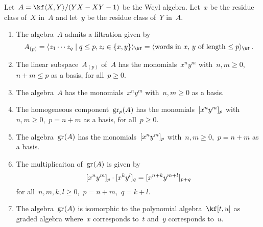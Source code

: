 \begin{proposition}
  \label{results about the weyl algerba}
  Let~$A = \kf\gen{X,Y} / \ideal{YX - XY - 1}$ be the Weyl algebra.
  Let~$x$ be the residue class of~$X$ in~$A$ and let~$y$ be the residue class of~$Y$ in~$A$.
  \begin{enumerate}
    \item
      The algebra~$A$ admits a filtration given by
      \[
        A_{(p)}
        =
        \gen{
          z_1 \dotsm z_q
          \suchthat
          q \leq p,
          z_i \in \{ x, y \}
        }_{\kf}
        =
        \gen{
          \text{words in~$x$,~$y$ of length~$\leq p$}
        }_{\kf} \,.
      \]
    \item
      \label{basis for filtration of weyl algebra}
      The linear subspace~$A_{(p)}$ of~$A$ has the monomials~$x^n y^m$ with~$n, m \geq 0$,~$n + m \leq p$ as a basis, for all~$p \geq 0$.
    \item
      The algebra~$A$ has the monomials~$x^n y^m$ with~$n, m \geq 0$ as a basis.
    \item
      \label{homogeneous basis for associated graded of weyl algebra}
      The homogeneous component~$\gr[p](A)$ has the monomials~$\lbrack x^n y^m \rbrack_p$ with~$n, m \geq 0$,~$p = n+m$ as a basis, for all~$p \geq 0$.
    \item
      \label{basis for associated graded of weyl algebra}
      The algebra~$\gr(A)$ has the monomials~$\lbrack x^n y^m \rbrack_p$ with~$n, m \geq 0$,~$p = n+m$ as a basis.
    \item
      \label{multiplication on basis of associated graded of weyl algebra}
      The multiplicaiton of~$\gr(A)$ is given by
      \[
        \lbrack x^n y^m \rbrack_p \cdot \lbrack x^k y^l \rbrack_q
        =
        \lbrack x^{n+k} y^{m+l} \rbrack_{p+q}
      \]
      for all~$n, m, k, l \geq 0$,~$p = n + m$,~$q = k + l$.
    \item
      The algebra~$\gr(A)$ is isomorphic to the polynomial algebra~$\kf[t,u]$ as graded algebra where~$x$ corresponds to~$t$ and~$y$ corresponds to~$u$.
  \end{enumerate}
\end{proposition}


